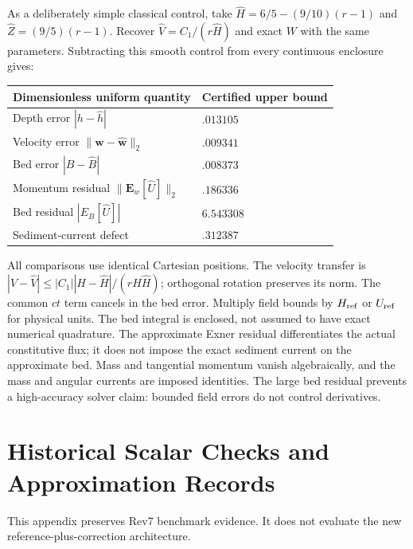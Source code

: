\documentclass[12pt,a4paper,oneside]{report}
\numberwithin{equation}{chapter}
\theoremstyle{remark}\newtheorem{remark}[theorem]{Remark}
\begin{document}
As a deliberately simple classical control, take
$\widehat H=6/5-(9/10)(r-1)$ and $\widehat Z=(9/5)(r-1)$.
Recover $\widehat V=C_1/(r\widehat H)$ and exact $W$ with the same parameters.
Subtracting this smooth control from every continuous enclosure gives:
\begin{center}\small
\begin{tabular}{ll}\toprule
Dimensionless uniform quantity & Certified upper bound\\\midrule
Depth error $|h-\widehat h|$ & $.013105$\\
Velocity error $\|\mathbf w-\widehat{\mathbf w}\|_2$ & $.009341$\\
Bed error $|B-\widehat B|$ & $.008373$\\
Momentum residual $\|\mathbf E_w[\widehat U]\|_2$ & $.186336$\\
Bed residual $|E_B[\widehat U]|$ & $6.543308$\\
Sediment-current defect & $.312387$\\\bottomrule
\end{tabular}
\end{center}
All comparisons use identical Cartesian positions. The velocity transfer is
$|V-\widehat V|\le |C_1||H-\widehat H|/(rH\widehat H)$; orthogonal rotation
preserves its norm. The common $ct$ term cancels in the bed error. Multiply
field bounds by $H_{\rm ref}$ or $U_{\rm ref}$ for physical units. The bed
integral is enclosed, not assumed to have exact numerical quadrature.
The approximate Exner residual differentiates the actual constitutive flux;
it does not impose the exact sediment current on the approximate bed.
Mass and tangential momentum vanish algebraically, and the mass and angular
currents are imposed identities. The large bed residual prevents a
high-accuracy solver claim: bounded field errors do not control derivatives.

\chapter{Historical Scalar Checks and Approximation Records}\label{ch:historical}
\noindent This appendix preserves Rev7 benchmark evidence. It does not evaluate the new reference-plus-correction architecture.
\end{document}
